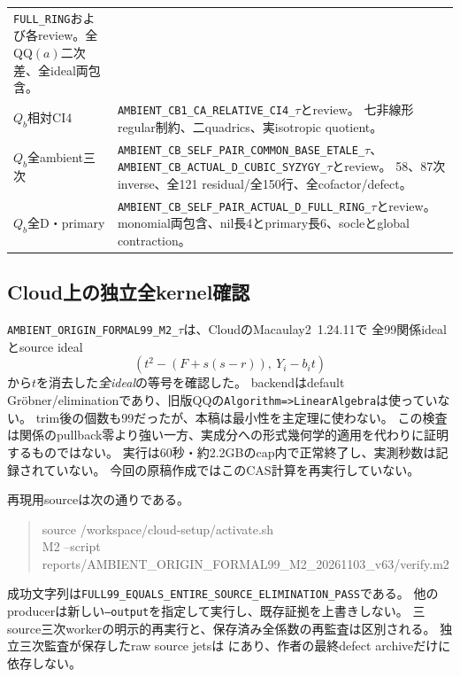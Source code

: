 \documentclass[11pt,a4paper]{ltjsarticle}
\theoremstyle{definition}
\theoremstyle{remark}
\begin{document}
\begin{longtable}{>{\raggedright\arraybackslash}p{}>{\raggedright\arraybackslash}p{}}
\texttt{FULL\_RING}および各review。全QQ$(a)$二次差、全ideal両包含。\\
$Q_b$相対CI4 & \texttt{AMBIENT\_CB1\_CA\_RELATIVE\_CI4\_}$\tau$とreview。
七非線形regular制約、二quadrics、実isotropic quotient。\\
$Q_b$全ambient三次 & \texttt{AMBIENT\_CB\_SELF\_PAIR\_COMMON\_BASE\_ETALE\_}$\tau$、
\texttt{AMBIENT\_CB\_ACTUAL\_D\_CUBIC\_SYZYGY\_}$\tau$とreview。
58、87次inverse、全121 residual/全150行、全cofactor/defect。\\
$Q_b$全D・primary & \texttt{AMBIENT\_CB\_SELF\_PAIR\_ACTUAL\_D\_FULL\_RING\_}$\tau$とreview。
monomial両包含、nil長4とprimary長6、socleとglobal contraction。\\\bottomrule
\end{longtable}

\subsection{Cloud上の独立全kernel確認}

\texttt{AMBIENT\_ORIGIN\_FORMAL99\_M2\_}$\tau$は、CloudのMacaulay2~1.24.11で
全99関係idealとsource ideal
\[
 (t^2-(F+s(s-r)),\ Y_i-b_it)
\]
から$t$を消去した\emph{全ideal}の等号を確認した。
backendはdefault Gröbner/eliminationであり、旧版QQの\texttt{Algorithm=>LinearAlgebra}は使っていない。
trim後の個数も99だったが、本稿は最小性を主定理に使わない。
この検査は関係のpullback零より強い一方、実成分への形式幾何学的適用を代わりに証明するものではない。
実行は60秒・約2.2GBのcap内で正常終了し、実測秒数は記録されていない。
今回の原稿作成ではこのCAS計算を再実行していない。

再現用sourceは次の通りである。
\begin{quote}\footnotesize\ttfamily
source /workspace/cloud-setup/activate.sh\\
M2 --script reports/AMBIENT\_ORIGIN\_FORMAL99\_M2\_20261103\_v63/verify.m2
\end{quote}
成功文字列は\texttt{FULL99\_EQUALS\_ENTIRE\_SOURCE\_ELIMINATION\_PASS}である。
他のproducerは新しい\texttt{--output}を指定して実行し、既存証拠を上書きしない。
三source三次workerの明示的再実行と、保存済み全係数の再監査は区別される。
独立三次監査が保存したraw source jetsは
にあり、作者の最終defect archiveだけに依存しない。
\end{document}
